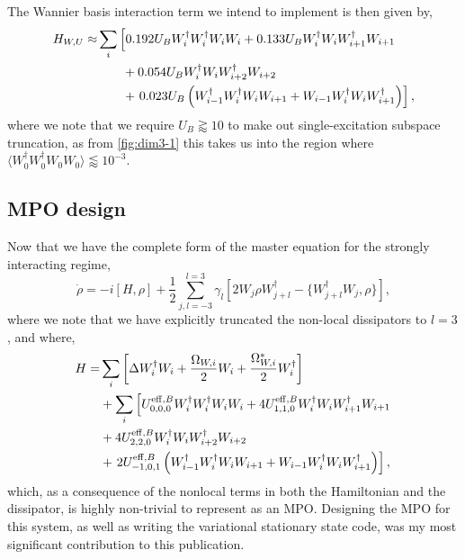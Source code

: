 The Wannier basis interaction term we intend to implement is then given by,
\begin{align}
	H_{W,U} \approx &\sum_{i} \left[ 0.192U_{B}W_{i}^{\dagger}W_{i}^{\dagger}W_{i}W_{i} + 0.133U_{B}W_{i}^{\dagger}W_{i}W_{i+1}^{\dagger}W_{i+1} \right. \notag \\ 
	&\qquad+ 0.054U_{B}W_{i}^{\dagger}W_{i}W_{i+2}^{\dagger}W_{i+2} \notag \\ 
	&\qquad+ \left. 0.023U_{B}\left(W_{i-1}^{\dagger}W_{i}^{\dagger}W_{i}W_{i+1} + W_{i-1}W_{i}^{\dagger}W_{i}W_{i+1}^{\dagger}\right)\right],
	\label{eq:dim3-1}
\end{align}
where we note that we require \(U_{B} \gtrapprox 10\) to make out single-excitation subspace truncation, as from \cref{fig:dim3-1} this takes us into the region where \(\langle W_{0}^{\dagger}W_{0}^{\dagger}W_{0}W_{0} \rangle \lessapprox 10^{-3}\).

\subsection{MPO design}
Now that we have the complete form of the master equation for the strongly interacting regime,
\begin{equation}
	\dot{\rho} = -i\left[H, \rho\right] + \frac{1}{2}\sum_{j,l=-3}^{l=3}\gamma_{l}\left[2W_{j}\rho W_{j+l}^{\dagger} - \{W_{j+l}^{\dagger}W_{j}, \rho\}\right],
	\label{eq:dim3-2}
\end{equation}
where we note that we have explicitly truncated the non-local dissipators to \(l=3\), and where,
\begin{align}
	H = &\sum_{i}\left[\Delta W_{i}^{\dagger}W_{i} + \frac{\Omega_{W,i}}{2}W_{i} + \frac{\Omega_{W,i}^{*}}{2}W_{i}^{\dagger}\right] \notag \\
	&+ \sum_{i}\left[ U^{\mathrm{eff},B}_{0,0,0}W_{i}^{\dagger}W_{i}^{\dagger}W_{i}W_{i} + 4U^{\mathrm{eff},B}_{1,1,0}W_{i}^{\dagger}W_{i}W_{i+1}^{\dagger}W_{i+1} \right. \notag \\ 
	&+ 4U^{\mathrm{eff},B}_{2,2,0}W_{i}^{\dagger}W_{i}W_{i+2}^{\dagger}W_{i+2} \notag \\ 
	&+ \left.2U^{\mathrm{eff},B}_{-1,0,1}\left(W_{i-1}^{\dagger}W_{i}^{\dagger}W_{i}W_{i+1} + W_{i-1}W_{i}^{\dagger}W_{i}W_{i+1}^{\dagger}\right) \right],
	\label{eq:dim3-3}
\end{align}
which, as a consequence of the nonlocal terms in both the Hamiltonian and the dissipator, is highly non-trivial to represent as an MPO. Designing the MPO for this system, as well as writing the variational stationary state code, was my most significant contribution to this publication. 

